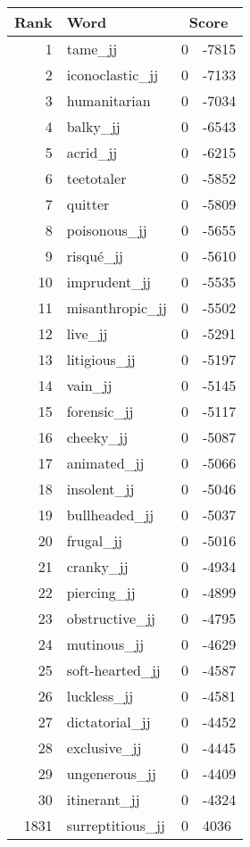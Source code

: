 \begin{longtable}[!htbp]{| rlr@{.}l |}
    \hline
    \textbf{Rank} & \textbf{Word} & \multicolumn{2}{c|}{\textbf{Score}} \\
    \hline
    \endhead
    1 & tame\_jj & 0 & -7815 \\
    2 & iconoclastic\_jj & 0 & -7133 \\
    3 & humanitarian & 0 & -7034 \\
    4 & balky\_jj & 0 & -6543 \\
    5 & acrid\_jj & 0 & -6215 \\
    6 & teetotaler & 0 & -5852 \\
    7 & quitter & 0 & -5809 \\
    8 & poisonous\_jj & 0 & -5655 \\
    9 & risqué\_jj & 0 & -5610 \\
    10 & imprudent\_jj & 0 & -5535 \\
    11 & misanthropic\_jj & 0 & -5502 \\
    12 & live\_jj & 0 & -5291 \\
    13 & litigious\_jj & 0 & -5197 \\
    14 & vain\_jj & 0 & -5145 \\
    15 & forensic\_jj & 0 & -5117 \\
    16 & cheeky\_jj & 0 & -5087 \\
    17 & animated\_jj & 0 & -5066 \\
    18 & insolent\_jj & 0 & -5046 \\
    19 & bullheaded\_jj & 0 & -5037 \\
    20 & frugal\_jj & 0 & -5016 \\
    21 & cranky\_jj & 0 & -4934 \\
    22 & piercing\_jj & 0 & -4899 \\
    23 & obstructive\_jj & 0 & -4795 \\
    24 & mutinous\_jj & 0 & -4629 \\
    25 & soft-hearted\_jj & 0 & -4587 \\
    26 & luckless\_jj & 0 & -4581 \\
    27 & dictatorial\_jj & 0 & -4452 \\
    28 & exclusive\_jj & 0 & -4445 \\
    29 & ungenerous\_jj & 0 & -4409 \\
    30 & itinerant\_jj & 0 & -4324 \\
    1831 & surreptitious\_jj & 0 & 4036 \\

\end{longtable}
